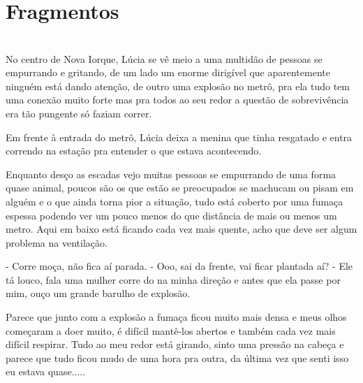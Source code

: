 
    
    


\newpage


\ifdefined\useChapters
\chapter{Fragmentos}

\else
\chapter{}
\fi


No centro de Nova Iorque, Lúcia se vê meio a uma multidão de pessoas se empurrando e gritando, de um lado um enorme dirigível que aparentemente ninguém está dando atenção, de outro uma explosão no metrô, pra ela tudo tem uma conexão muito forte mas pra todos ao seu redor a questão de sobrevivência era tão pungente só faziam correr.

Em frente à entrada do metrô, Lúcia deixa a menina que tinha resgatado e entra correndo na estação pra entender o que estava acontecendo.

Enquanto desço as escadas vejo muitas pessoas se empurrando de uma forma quase animal, poucos são os que estão se preocupados se machucam ou pisam em alguém e o que ainda torna pior a situação, tudo está coberto por uma fumaça espessa podendo ver um pouco menos do que distância de mais ou menos um metro.
Aqui em baixo está ficando cada vez mais quente, acho que deve ser algum problema na ventilação.

- Corre moça, não fica aí parada.
- Ooo, sai da frente, vai ficar plantada aí?
- Ele tá louco, fala uma mulher corre do na minha direção e antes que ela passe por mim, ouço um grande barulho de explosão.

Parece que junto com a explosão a fumaça ficou muito mais densa e meus olhos começaram a doer muito, é difícil mantê-los abertos e também cada vez mais difícil respirar.
Tudo ao meu redor está girando, sinto uma pressão na cabeça e parece que tudo ficou mudo de uma hora pra outra, da última vez que senti isso eu estava quase.....


